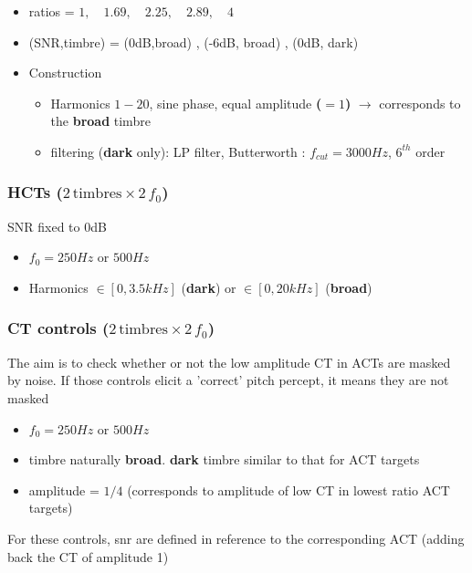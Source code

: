 \documentclass[11pt,a4paper,oneside]{article}
\begin{document}
\begin{itemize}
\item  ratios = $1, \quad 1.69,\quad 2.25,\quad 2.89,\quad 4$
\item  (SNR,timbre) = (0dB,broad) , (-6dB, broad) , (0dB, dark)
\item Construction
  \begin{itemize}
  \item  Harmonics $1-20$, sine phase, equal amplitude \textbf{($=1$)} $\rightarrow$ corresponds to the \textbf{broad} timbre
  \item  filtering (\textbf{dark} only): LP filter, Butterworth : $f_{cut} = 3000 Hz$, $6^{th}$ order
  \end{itemize}
\end{itemize}




\subsubsection{HCTs ($2 \, \text{timbres} \times 2 \, f_0 $)}

SNR fixed to 0dB

\begin{itemize}
\item $f_0 = 250Hz$ or  $500 Hz$
\item Harmonics $\in [0, 3.5 kHz]$ (\textbf{dark}) or $\in [0, 20 kHz]$ (\textbf{broad}) 
\end{itemize}


\subsubsection{CT controls ($2 \, \text{timbres} \times 2 \, f_0 $)}

The aim is to check whether or not the low amplitude CT in ACTs are masked by noise.
If those controls elicit a 'correct' pitch percept, it means they are not masked

\begin{itemize}
\item $f_0 = 250Hz$ or  $500 Hz$
\item timbre naturally \textbf{broad}. \textbf{dark} timbre similar to that for ACT targets
\item   amplitude = $1/4$ (corresponds to amplitude of low CT in lowest ratio ACT targets) 
\end{itemize}

For these controls, snr are defined in reference to the corresponding ACT (adding back the CT of amplitude 1)
\end{document}

